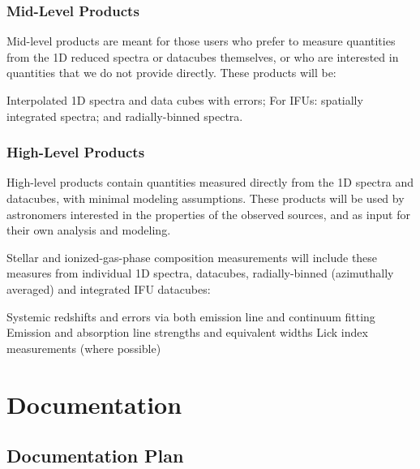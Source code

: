 \documentclass[11pt,a4paper,twoside,onecolumn,openany,final,oldfontcommands]{memoir}
\begin{document}
\subsection{Mid-Level Products} \label{sec:mid_level_products}

Mid-level products are meant for those users who prefer to measure quantities from the 1D reduced spectra or datacubes themselves, or who are interested in quantities that we do not provide directly. These products will be: 

\begin{datarequirement}

\reqitem Interpolated 1D spectra and data cubes with errors;
\reqitem For IFUs: spatially integrated spectra; and
\reqitem radially-binned spectra.

\end{datarequirement}


\subsection{High-Level Products} \label{sec:high_level_products}

High-level products contain quantities measured directly from the 1D spectra and datacubes, with minimal modeling assumptions. These products will be used by astronomers interested in the properties of the observed sources, and as input for their own analysis and modeling.

\medskip

\noindent Stellar and ionized-gas-phase composition measurements will include these measures from individual 1D spectra, datacubes, radially-binned (azimuthally averaged) and integrated IFU datacubes:

\begin{datarequirement}

\reqitem Systemic redshifts and errors via both emission line and continuum fitting
\reqitem Emission and absorption line strengths and equivalent widths
\reqitem Lick index measurements (where possible)

\end{datarequirement}

\chapter{Documentation}

\section{Documentation Plan} \label{sec:documentation}
\end{document}
